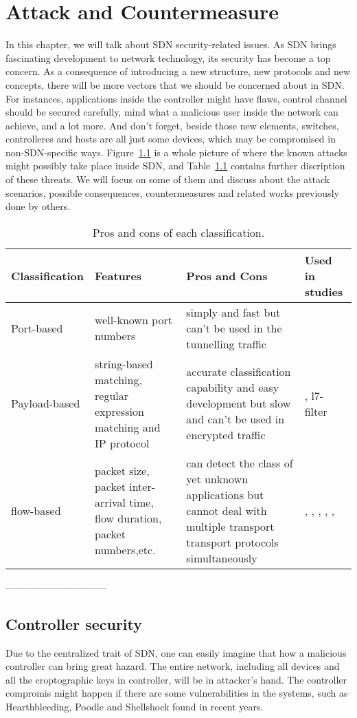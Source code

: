 \chapter{Attack and Countermeasure}
In this chapter, we will talk about SDN security-related issues. As SDN brings fascinating development to network technology, its security has become a top concern. As a consequence of introducing a new structure, new protocols and new concepts, there will be more vectors that we should be concerned about in SDN. For instances, applications inside the controller might have flaws, control channel should be secured carefully, mind what a malicious user inside the network can achieve, and a lot more. And don't forget, beside those new elements, switches, controlleres and hosts are all just some devices, which may be compromised in non-SDN-specific ways. Figure~\ref{} is a whole picture of where the known attacks might possibly take place inside SDN, and Table~\ref{} contains further discription of these threats. We will focus on some of them and discuss about the attack scenarios, possible consequences, countermeasures and related works previously done by others.

\begin{table}[H]
\centering
\caption{Pros and cons of each classification.}
\begin{tabular}{|l|p{3.5cm}|p{3.5cm}|p{3.5cm}|}
\hline Classification & Features & Pros and Cons & Used in studies \\
\hline
\hline Port-based & well-known port numbers & simply and fast but can't be used in the tunnelling traffic & \cite{TTC}\\
\hline Payload-based &  string-based matching, regular expression matching and IP protocol & accurate classification capability and easy development but slow and can't be used in encrypted traffic & \cite{nDPI} , {l7-filter} \\
\hline flow-based & packet size, packet inter-arrival time, flow duration, packet numbers,etc. & can detect the class of yet unknown applications but cannot deal with multiple transport transport protocols simultaneously & \cite{EAI06}, \cite{ATC13}, \cite{AIS14}, \cite{CMF04}, \cite{COC12}, \cite{FPN13, RTC10, AIS14, ASA09, FTC09} \\
\hline 
\end{tabular}
\label{table:pros-cons}
\end{table}

--------------------------------
\section{Controller security}
Due to the centralized trait of SDN, one can easily imagine that how a malicious controller can bring great hazard. The entire network, including all devices and all the croptographic keys in controller, will be in attacker's hand. The controller compromis might happen if there are some vulnerabilities in the systems, such as Hearthbleeding, Poodle and Shellshock found in recent years.



